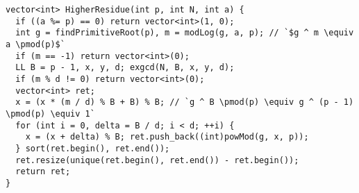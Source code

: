 \begin{lstlisting}
vector<int> HigherResidue(int p, int N, int a) {
  if ((a %= p) == 0) return vector<int>(1, 0);
  int g = findPrimitiveRoot(p), m = modLog(g, a, p); // `$g ^ m \equiv a \pmod(p)$`
  if (m == -1) return vector<int>(0);
  LL B = p - 1, x, y, d; exgcd(N, B, x, y, d);
  if (m % d != 0) return vector<int>(0);
  vector<int> ret;
  x = (x * (m / d) % B + B) % B; // `g ^ B \pmod(p) \equiv g ^ (p - 1) \pmod(p) \equiv 1`
  for (int i = 0, delta = B / d; i < d; ++i) {
    x = (x + delta) % B; ret.push_back((int)powMod(g, x, p));
  } sort(ret.begin(), ret.end());
  ret.resize(unique(ret.begin(), ret.end()) - ret.begin());
  return ret;
}
\end{lstlisting}